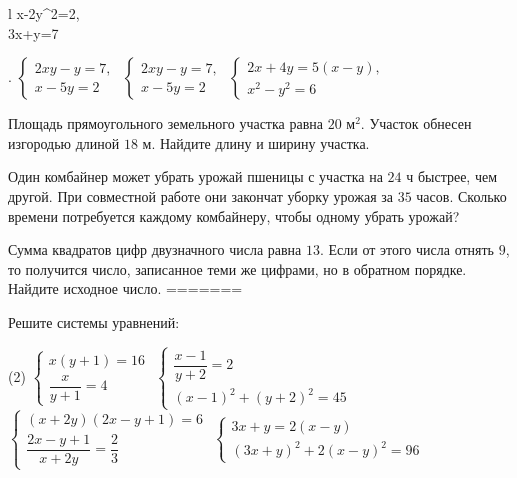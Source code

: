 \begin{class}[number=5]
\begin{listofex}
\begin{tasks}
\begin{array}{l}
				x-2y^2=2,\\
				3x+y=7
			\end{array}
			\right.
			\)
			\task
			\(
			\left\{
			\begin{array}{l}
				2xy-y=7,\\
				x-5y=2
			\end{array}
			\right.
			\)
			\task
			\(
			\left\{
			\begin{array}{l}
				2xy-y=7,\\
				x-5y=2
			\end{array}
			\right.
			\)
			\task
			\(
			\left\{
			\begin{array}{l}
				2x+4y=5(x-y),\\
				x^2-y^2=6
			\end{array}
			\right.
			\)
		\end{tasks}
		\item Площадь прямоугольного земельного участка равна \( 20 \) м\(^2\). Участок обнесен изгородью длиной \( 18 \) м. Найдите длину и ширину участка.
		\item Один комбайнер может убрать урожай пшеницы с участка на \( 24 \) ч быстрее, чем другой.
		При совместной работе они закончат уборку урожая за \( 35 \) часов.
		Сколько времени потребуется каждому комбайнеру,
		чтобы одному убрать урожай?
		\item Сумма квадратов цифр двузначного числа равна \( 13 \).
		Если от этого числа отнять \( 9 \), то получится число, записанное теми же цифрами,
		но в обратном порядке. Найдите исходное число.
=======
		\item Решите системы уравнений:
		\begin{tasks}(2)
			\task \( \begin{cases} x(y+1)=16 \\ \dfrac{ x }{ y+1 }=4 \end{cases} \)
			\task \( \begin{cases} \dfrac{ x-1 }{ y+2 }=2 \\ (x-1)^2+(y+2)^2=45 \end{cases} \)
			\task \( \begin{cases} (x+2y)(2x-y+1)=6 \\ \dfrac{ 2x-y+1 }{ x+2y }=\dfrac{ 2 }{ 3 } \end{cases} \)
			\task \( \begin{cases} 3x+y=2(x-y) \\ (3x+y)^2+2(x-y)^2=96 \end{cases} \)
		\end{tasks}

\end{listofex}
\end{class}
